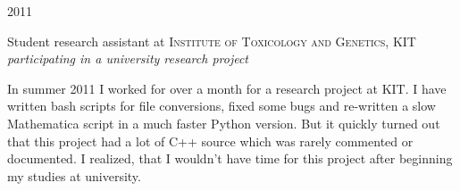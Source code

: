\documentclass[a4paper,10pt]{article} %
\begin{document}
{\begin{minipage}[t]{0.5\textwidth}

{\raggedleft\textsc{2011}\par}

{\raggedright\large Student research assistant at \textsc{ Institute of Toxicology and Genetics}, KIT\\
\textit{participating in a university research project}\\[5pt]}

\normalsize{In summer 2011 I worked for over a month for a
research project at KIT. I have written bash scripts for file
conversions, fixed some bugs and re-written a slow Mathematica script
in a much faster Python version. But it quickly turned out that
this project had a lot of C++ source which was rarely commented or
documented. I realized, that I wouldn't have time for this project
after beginning my studies at university.}\\







\end{minipage} %
\hfill
\begin{minipage}[t]{0.44\textwidth}
\vspace{0pt} %



\end{minipage}}
\end{document}
